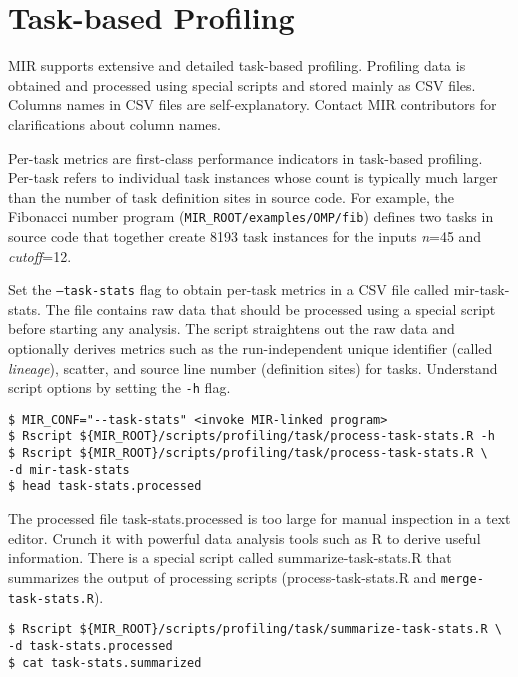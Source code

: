 \documentclass[11pt,a4paper]{article}
\begin{document}
\section{Task-based Profiling}\label{sec:task-based-profiling}

MIR supports extensive and detailed task-based profiling. Profiling data is obtained and processed using special scripts and stored mainly as CSV files. Columns names in CSV files are self-explanatory. Contact MIR contributors for clarifications about column names.

Per-task metrics are first-class performance indicators in task-based profiling.
Per-task refers to individual task instances whose count is typically much larger than the number of task definition sites in source code. For example, the Fibonacci number program (\texttt{MIR\_ROOT/examples/OMP/fib}) defines two tasks in source code that together create 8193 task instances for the inputs \textit{n}=45 and \textit{cutoff}=12.

Set the \texttt{--task-stats} flag to obtain per-task metrics in a CSV file called \textsf{mir-task-stats}. The file contains raw data that should be processed using a special script before starting any analysis. The script straightens out the raw data and optionally derives metrics such as the run-independent unique identifier (called \textit{lineage}), scatter, and source line number (definition sites) for tasks. Understand script options by setting the \texttt{-h} flag.

\begin{lstlisting}[style=MyInputStyle]
$ MIR_CONF="--task-stats" <invoke MIR-linked program>
$ Rscript ${MIR_ROOT}/scripts/profiling/task/process-task-stats.R -h
$ Rscript ${MIR_ROOT}/scripts/profiling/task/process-task-stats.R \
-d mir-task-stats
$ head task-stats.processed
\end{lstlisting}

The processed file \textsf{task-stats.processed} is too large for manual inspection in a text editor. Crunch it with powerful data analysis tools such as R to derive useful information. There is a special script called \textsf{summarize-task-stats.R} that summarizes the output of processing scripts (\textsf{process-task-stats.R} and \texttt{merge-task-stats.R}).
\begin{lstlisting}[style=MyInputStyle]
$ Rscript ${MIR_ROOT}/scripts/profiling/task/summarize-task-stats.R \
-d task-stats.processed
$ cat task-stats.summarized
\end{lstlisting}
\end{document}
